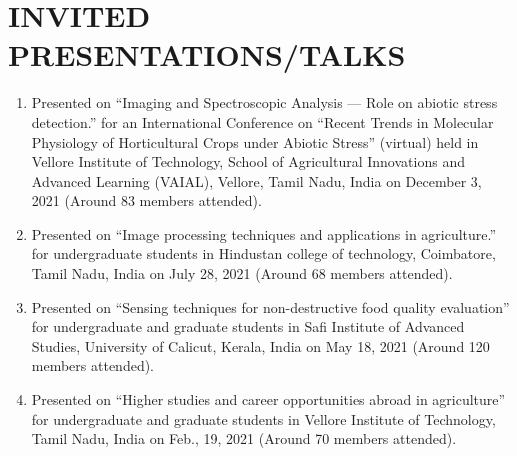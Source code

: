 \documentclass[11pt]{article}
\begin{document}
\newpage
\section*{INVITED PRESENTATIONS/TALKS}
\begin{enumerate}[itemsep=-2pt]
\item Presented on ``Imaging and Spectroscopic Analysis --- Role on abiotic stress detection.'' for an International Conference on ``Recent Trends in Molecular Physiology of Horticultural Crops under Abiotic Stress'' (virtual) held in Vellore Institute of Technology, School of Agricultural Innovations and Advanced Learning (VAIAL), Vellore, Tamil Nadu, India on December 3,  2021 (Around 83 members attended).

\item Presented on ``Image processing techniques and applications in agriculture.'' for undergraduate students in Hindustan college of technology, Coimbatore, Tamil Nadu, India on July 28, 2021 (Around 68 members attended).

\item Presented on ``Sensing techniques for non-destructive food quality evaluation'' for undergraduate and graduate students in Safi Institute of Advanced Studies, University of Calicut, Kerala, India on May 18, 2021 (Around 120 members attended).

\item Presented on ``Higher studies and career opportunities abroad in agriculture'' for undergraduate and graduate students in Vellore Institute of Technology, Tamil Nadu, India on Feb., 19, 2021 (Around 70 members attended).

\end{enumerate}

\end{document}
